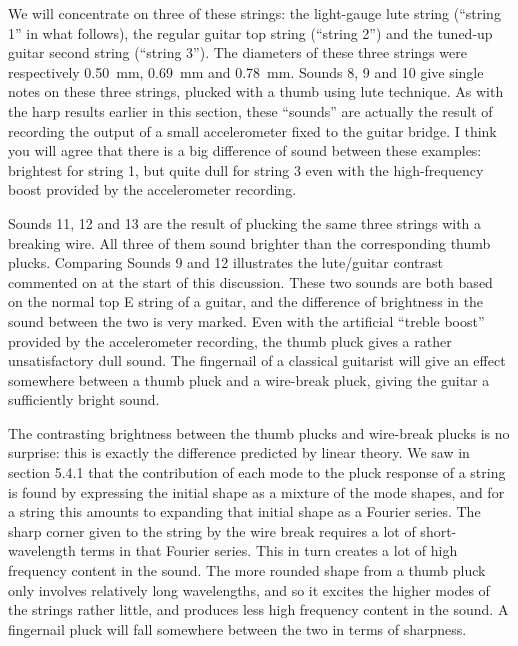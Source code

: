   We will concentrate on three of these strings: the light-gauge lute string 
  (“string 1” in what follows), the regular guitar top string (“string 2”) and 
  the tuned-up guitar second string (“string 3”). The diameters of these three 
  strings were respectively 0.50~mm, 0.69~mm and 0.78~mm. Sounds 8, 9 and 10 
  give single notes on these three strings, plucked with a thumb using lute 
  technique. As with the harp results earlier in this section, these “sounds” 
  are actually the result of recording the output of a small accelerometer 
  fixed to the guitar bridge. I think you will agree that there is a big 
  difference of sound between these examples: brightest for string 1, but quite 
  dull for string 3 even with the high-frequency boost provided by the 
  accelerometer recording. 

  Sounds 11, 12 and 13 are the result of plucking the same three strings with a 
  breaking wire. All three of them sound brighter than the corresponding thumb 
  plucks. Comparing Sounds 9 and 12 illustrates the lute/guitar contrast 
  commented on at the start of this discussion. These two sounds are both based 
  on the normal top E string of a guitar, and the difference of brightness in 
  the sound between the two is very marked. Even with the artificial “treble 
  boost” provided by the accelerometer recording, the thumb pluck gives a 
  rather unsatisfactory dull sound. The fingernail of a classical guitarist 
  will give an effect somewhere between a thumb pluck and a wire-break pluck, 
  giving the guitar a sufficiently bright sound. 

  The contrasting brightness between the thumb plucks and wire-break plucks is 
  no surprise: this is exactly the difference predicted by linear theory. We 
  saw in section 5.4.1 that the contribution of each mode to the pluck response 
  of a string is found by expressing the initial shape as a mixture of the mode 
  shapes, and for a string this amounts to expanding that initial shape as a 
  Fourier series. The sharp corner given to the string by the wire break 
  requires a lot of short-wavelength terms in that Fourier series. This in turn 
  creates a lot of high frequency content in the sound. The more rounded shape 
  from a thumb pluck only involves relatively long wavelengths, and so it 
  excites the higher modes of the strings rather little, and produces less high 
  frequency content in the sound. A fingernail pluck will fall somewhere 
  between the two in terms of sharpness. 

